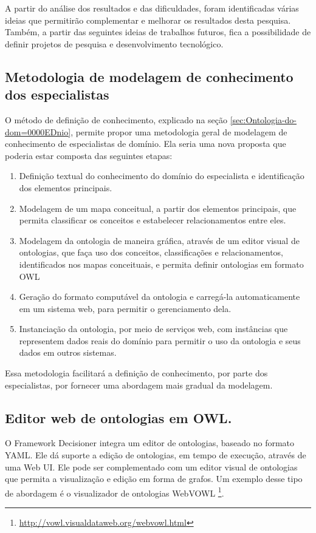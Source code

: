 A partir do análise dos resultados e das dificuldades, foram identificadas
várias ideias que permitirão complementar e melhorar os resultados
desta pesquisa. Também, a partir das seguintes ideias de trabalhos
futuros, fica a possibilidade de definir projetos de pesquisa e desenvolvimento
tecnológico.

\subsection*{Metodologia de modelagem de conhecimento dos especialistas}

O método de definição de conhecimento, explicado na seção \ref{sec:Ontologia-do-dom=0000EDnio},
permite propor uma metodologia geral de modelagem de conhecimento
de especialistas de domínio. Ela seria uma nova proposta que poderia
estar composta das seguintes etapas:
\begin{enumerate}
\item Definição textual do conhecimento do domínio do especialista e identificação
dos elementos principais.
\item Modelagem de um mapa conceitual, a partir dos elementos principais,
que permita classificar os conceitos e estabelecer relacionamentos
entre eles.
\item Modelagem da ontologia de maneira gráfica, através de um editor visual
de ontologias, que faça uso dos conceitos, classificações e relacionamentos,
identificados nos mapas conceituais, e permita definir ontologias
em formato \foreignlanguage{english}{OWL}
\item Geração do formato computável da ontologia e carregá-la automaticamente
em um sistema web, para permitir o gerenciamento dela.
\item Instanciação da ontologia, por meio de serviços \foreignlanguage{english}{web,}
com instâncias que representem dados reais do domínio para permitir
o uso da ontologia e seus dados em outros sistemas.
\end{enumerate}
Essa metodologia facilitará a definição de conhecimento, por parte
dos especialistas, por fornecer uma abordagem mais gradual da modelagem.

\subsection*{Editor web de ontologias em OWL.}

O Framework Decisioner integra um editor de ontologias, baseado no
formato \foreignlanguage{english}{YAML}. Ele dá suporte a edição de
ontologias, em tempo de execução, através de uma Web UI. Ele pode
ser complementado com um editor visual de ontologias que permita a
visualização e edição em forma de grafos. Um exemplo desse tipo de
abordagem é o visualizador de ontologias WebVOWL \footnote{\url{http://vowl.visualdataweb.org/webvowl.html}}. 

